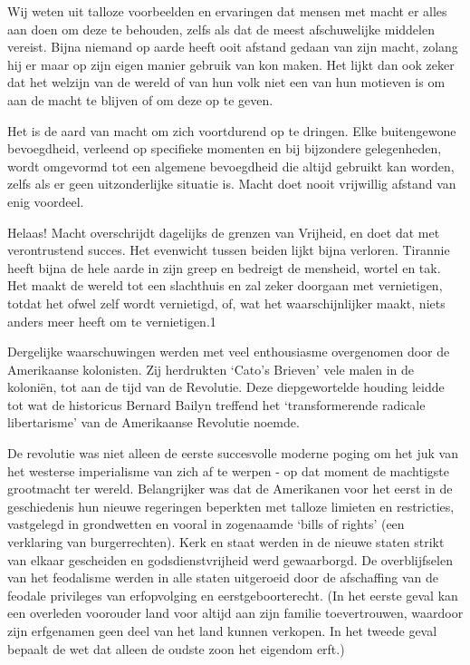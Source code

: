 \documentclass[
  a5paper,
  smalldemyvopaper,10pt,twoside,onecolumn,openright,extrafontsizes,hidelinks]{memoir}
\renewenvironment{quote}%
               {\list{}{\rightmargin=.6cm\leftmargin=.6cm}%
                \itshape \item[]}%
               {\endlist}
\begin{document}
\begin{quote}
Wij weten uit talloze voorbeelden en ervaringen dat mensen met macht er
alles aan doen om deze te behouden, zelfs als dat de meest afschuwelijke
middelen vereist. Bijna niemand op aarde heeft ooit afstand gedaan van
zijn macht, zolang hij er maar op zijn eigen manier gebruik van kon
maken. Het lijkt dan ook zeker dat het welzijn van de wereld of van hun
volk niet een van hun motieven is om aan de macht te blijven of om deze
op te geven.

Het is de aard van macht om zich voortdurend op te dringen. Elke
buitengewone bevoegdheid, verleend op specifieke momenten en bij
bijzondere gelegenheden, wordt omgevormd tot een algemene bevoegdheid
die altijd gebruikt kan worden, zelfs als er geen uitzonderlijke
situatie is. Macht doet nooit vrijwillig afstand van enig voordeel.

Helaas! Macht overschrijdt dagelijks de grenzen van Vrijheid, en doet
dat met verontrustend succes. Het evenwicht tussen beiden lijkt bijna
verloren. Tirannie heeft bijna de hele aarde in zijn greep en bedreigt
de mensheid, wortel en tak. Het maakt de wereld tot een slachthuis en
zal zeker doorgaan met vernietigen, totdat het ofwel zelf wordt
vernietigd, of, wat het waarschijnlijker maakt, niets anders meer heeft
om te vernietigen.1
\end{quote}

Dergelijke waarschuwingen werden met veel enthousiasme overgenomen door
de Amerikaanse kolonisten. Zij herdrukten `Cato's Brieven' vele malen in
de koloniën, tot aan de tijd van de Revolutie. Deze diepgewortelde
houding leidde tot wat de historicus Bernard Bailyn treffend het
`transformerende radicale libertarisme' van de Amerikaanse Revolutie
noemde.

De revolutie was niet alleen de eerste succesvolle moderne poging om het
juk van het westerse imperialisme van zich af te werpen - op dat moment
de machtigste grootmacht ter wereld. Belangrijker was dat de Amerikanen
voor het eerst in de geschiedenis hun nieuwe regeringen beperkten met
talloze limieten en restricties, vastgelegd in grondwetten en vooral in
zogenaamde `bills of rights' (een verklaring van burgerrechten). Kerk en
staat werden in de nieuwe staten strikt van elkaar gescheiden en
godsdienstvrijheid werd gewaarborgd. De overblijfselen van het
feodalisme werden in alle staten uitgeroeid door de afschaffing van de
feodale privileges van erfopvolging en eerstgeboorterecht. (In het
eerste geval kan een overleden voorouder land voor altijd aan zijn
familie toevertrouwen, waardoor zijn erfgenamen geen deel van het land
kunnen verkopen. In het tweede geval bepaalt de wet dat alleen de oudste
zoon het eigendom erft.)
\end{document}
